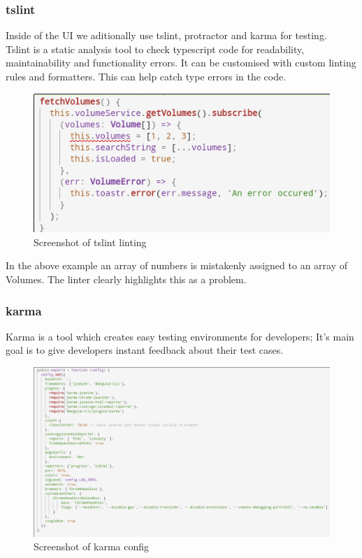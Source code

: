 \documentclass[]{article}
\begin{document}
\subsubsection{tslint}
Inside of the UI we aditionally use tslint, protractor and karma for testing.
\\
Tslint is a static analysis tool to check typescript code for readability, maintainability and functionality errors.
It can be customised with custom linting rules and formatters.
This can help catch type errors in the code.
\begin{figure}[H]
	\centering
	\includegraphics[scale=0.5]{tslint_error.png}
	\caption{Screenshot of tslint linting}
\end{figure}

In the above example an array of numbers is mistakenly assigned to an array of Volumes. 
The linter clearly highlights this as a problem.

\pagebreak

\subsubsection{karma}
Karma is a tool which creates easy testing environments for developers; It's main goal 
is to give developers instant feedback about their test cases.
\begin{figure}[H]
	\centering
	\includegraphics[scale=0.5]{karma.png}
	\caption{Screenshot of karma config}
\end{figure}
\end{document}
